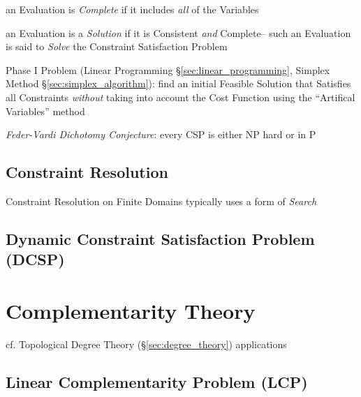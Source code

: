 an Evaluation is \emph{Complete} if it includes \emph{all} of the Variables

an Evaluation is a \emph{Solution} if it is Consistent \emph{and} Complete--
such an Evaluation is said to \emph{Solve} the Constraint Satisfaction Problem

\fist Phase I Problem (Linear Programming \S\ref{sec:linear_programming},
Simplex Method \S\ref{sec:simplex_algorithm}): find an initial Feasible
Solution that Satisfies all Constraints \emph{without} taking into account the
Cost Function using the ``Artifical Variables'' method

\emph{Feder-Vardi Dichotomy Conjecture}: every CSP is either NP hard or in P



\subsection{Constraint Resolution}\label{sec:constraint_resolution}

Constraint Resolution on Finite Domains typically uses a form of \emph{Search}



\subsection{Dynamic Constraint Satisfaction Problem (DCSP)}\label{sec:dcsp}



\section{Complementarity Theory}\label{sec:complementarity_theory}

cf. Topological Degree Theory (\S\ref{sec:degree_theory}) applications



\subsection{Linear Complementarity Problem (LCP)}
\label{sec:linear_complementarity}

